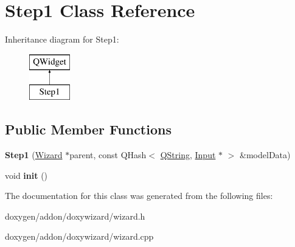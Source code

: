 \hypertarget{class_step1}{}\section{Step1 Class Reference}
\label{class_step1}
Inheritance diagram for Step1\+:\begin{figure}[H]
\begin{center}
\leavevmode
\includegraphics[height=2.000000cm]{class_step1}
\end{center}
\end{figure}
\subsection*{Public Member Functions}
\begin{DoxyCompactItemize}
\item 
\mbox{\label{class_step1_af82775f9b7e4ddefccad799c9f8ed5a5}} 
{\bfseries Step1} (\mbox{\hyperlink{class_wizard}{Wizard}} $\ast$parent, const Q\+Hash$<$ \mbox{\hyperlink{class_q_string}{Q\+String}}, \mbox{\hyperlink{class_input}{Input}} $\ast$ $>$ \&model\+Data)
\item 
\mbox{\label{class_step1_a5465f7a369f398f13c1fb7ee0588f5b1}} 
void {\bfseries init} ()
\end{DoxyCompactItemize}


The documentation for this class was generated from the following files\+:\begin{DoxyCompactItemize}
\item 
doxygen/addon/doxywizard/wizard.\+h\item 
doxygen/addon/doxywizard/wizard.\+cpp\end{DoxyCompactItemize}
